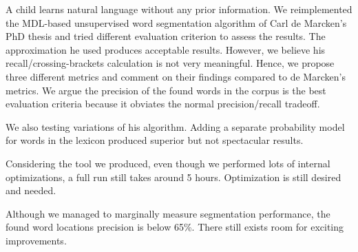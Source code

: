 \documentclass[11pt, oneside, fleqn]{article}
\begin{document}
  A child learns natural language without any prior information. We reimplemented the MDL-based unsupervised word segmentation algorithm of Carl de Marcken's PhD thesis and tried different evaluation criterion to assess the results.  The approximation he used produces acceptable results. However, we believe his recall/crossing-brackets calculation is not very meaningful. Hence, we propose three different metrics and comment on their findings compared to de Marcken's metrics. We argue the precision of the found words in the corpus is the best evaluation criteria because it obviates the normal precision/recall tradeoff.
  
  We also testing variations of his algorithm. Adding a separate probability model for words in the lexicon produced superior but not spectacular results.
  
  Considering the tool we produced, even though we performed lots of internal optimizations, a full run still takes around 5 hours. Optimization is still desired and needed. 

  Although we managed to marginally measure segmentation performance, the found word locations precision is below 65\%. There still exists room for exciting improvements.

{}

\end{document}
